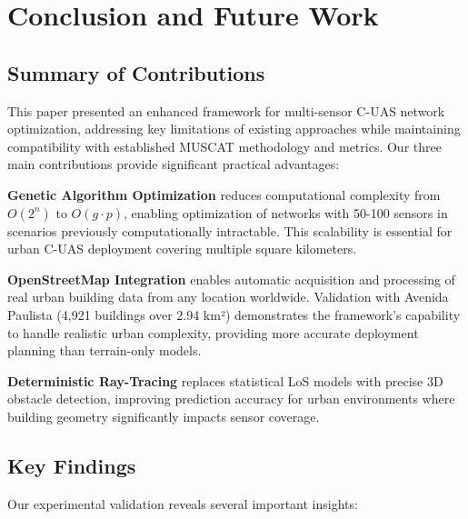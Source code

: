 
\section{Conclusion and Future Work}

\subsection{Summary of Contributions}

This paper presented an enhanced framework for multi-sensor C-UAS network optimization, addressing key limitations of existing approaches while maintaining compatibility with established MUSCAT methodology and metrics. Our three main contributions provide significant practical advantages:

\textbf{Genetic Algorithm Optimization} reduces computational complexity from $O(2^n)$ to $O(g \cdot p)$, enabling optimization of networks with 50-100 sensors in scenarios previously computationally intractable. This scalability is essential for urban C-UAS deployment covering multiple square kilometers.

\textbf{OpenStreetMap Integration} enables automatic acquisition and processing of real urban building data from any location worldwide. Validation with Avenida Paulista (4,921 buildings over 2.94 km²) demonstrates the framework's capability to handle realistic urban complexity, providing more accurate deployment planning than terrain-only models.

\textbf{Deterministic Ray-Tracing} replaces statistical LoS models with precise 3D obstacle detection, improving prediction accuracy for urban environments where building geometry significantly impacts sensor coverage.

\subsection{Key Findings}

Our experimental validation reveals several important insights:

